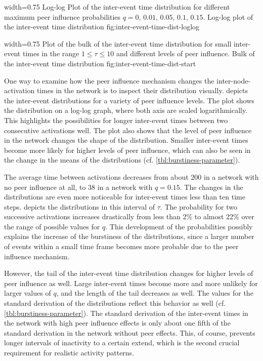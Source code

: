       {width=0.75\textwidth}
      {Log-log Plot of the inter-event time distribution for different maximum peer influence probabilities \( q = 0, \, 0.01, \, 0.05, \, 0.1, \, 0.15\).}
      {Log-log plot of the inter-event time distribution}
      {fig:inter-event-time-dist-loglog}


      {width=0.75\textwidth}
      {Plot of the bulk of the inter-event time distribution for small inter-event times in the range \( 1 \leq \tau \leq 10 \) and different levels of peer influence.}
      {Bulk of the inter-event time distribution}
      {fig:inter-event-time-dist-start}


One way to examine how the peer influence mechanism changes the inter-node-activation times in the network is to inspect their distribution visually.
 depicts the inter-event distributions for a variety of peer influence levels.
The plot shows the distribution on a log-log graph, where both axis are scaled logarithmically.
This highlights the possibilities for longer inter-event times between two consecutive activations well.
The plot also shows that the level of peer influence in the network changes the shape of the distribution.
Smaller inter-event times become more likely for higher levels of peer influence, which can also be seen in the change in the means of the distributions (cf. \cref{tbl:burstiness-parameter}).

The average time between activations decreases from about 200 in a network with no peer influence at all, to 38 in a network with \( q = 0.15 \).
The changes in the distributions are even more noticeable for inter-event times less than ten time steps.
 depicts the distributions in this interval of \( \tau \).
The probability for two successive activations increases drastically from less than 2\% to almost 22\% over the range of possible values for \( q \).
This development of the probabilities possibly explains the increase of the burstiness of the distributions, since a larger number of events within a small time frame becomes more probable due to the peer influence mechanism.

However, the tail of the inter-event time distribution changes for higher levels of peer influence as well.
Large inter-event times become more and more unlikely for larger values of \( q \), and the length of the tail decreases as well.
The values for the standard derivation of the distributions reflect this behavior as well (cf. \cref{tbl:burstiness-parameter}).
The standard derivation of the inter-event times in the network with high peer influence effects is only about one fifth of the standard derivation in the network without peer effects.
This, of course, prevents longer intervals of inactivity to a certain extend, which is the second crucial requirement for realistic activity patterns.


